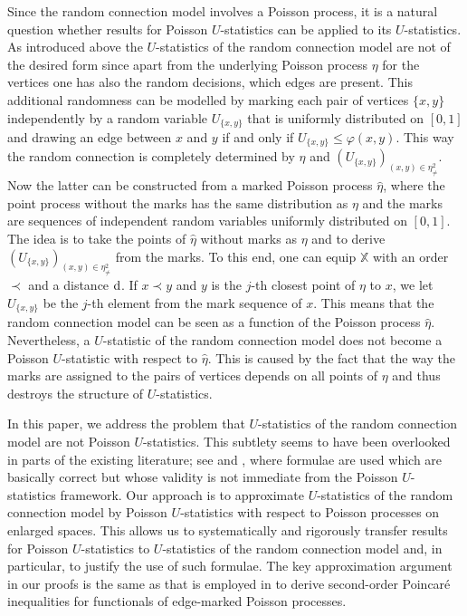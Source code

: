 \documentclass{article}
\theoremstyle{definition}
\numberwithin{equation}{section}
\theoremstyle{remark}
\begin{document}
Since the random connection model involves a Poisson process, it is a natural question whether results for Poisson $U$-statistics can be applied to its $U$-statistics. As introduced above the $U$-statistics of the random connection model are not of the desired form since apart from the underlying Poisson process $\eta$ for the vertices one has also the random decisions, which edges are present. This additional randomness can be modelled by marking each pair of vertices $\{x,y\}$ independently by a random variable $U_{\{x,y\}}$ that is uniformly distributed on $[0,1]$ and drawing an edge between $x$ and $y$ if and only if $U_{\{x,y\}}\leq\varphi(x,y)$. This way the random connection is completely determined by $\eta$ and $(U_{\{x,y\}})_{(x,y)\in\eta^2_{\neq}}$. Now the latter can be constructed from a marked Poisson process $\widehat{\eta}$, where the point process without the marks has the same distribution as $\eta$ and the marks are sequences of independent random variables uniformly distributed on $[0,1]$. The idea is to take the points of $\widehat{\eta}$ without marks as $\eta$ and to derive $(U_{\{x,y\}})_{(x,y)\in\eta^2_{\neq}}$ from the marks. To this end, one can equip $\mathbb{X}$ with an order $\prec$ and a distance ${\rm d}$. If $x\prec y$ and $y$ is the $j$-th closest point of $\eta$ to $x$, we let $U_{\{x,y\}}$ be the $j$-th element from the mark sequence of $x$. This means that the random connection model can be seen as a function of the Poisson process $\widehat{\eta}$. Nevertheless, a $U$-statistic of the random connection model does not become a Poisson $U$-statistic with respect to $\widehat{\eta}$. This is caused by the fact that the way the marks are assigned to the pairs of vertices depends on all points of $\eta$ and thus destroys the structure of $U$-statistics.   

In this paper, we address the problem that $U$-statistics of the random connection model are not Poisson $U$-statistics. This subtlety seems to have been overlooked in parts of the existing literature; see \cite{Heerten_Hirsch_Otto} and \cite{Otto25}, where formulae are used which are basically correct but whose validity is not immediate from the Poisson $U$-statistics framework. Our approach is to approximate $U$-statistics of the random connection model by Poisson $U$-statistics with respect to Poisson processes on enlarged spaces. This allows us to systematically and rigorously transfer results for Poisson $U$-statistics to $U$-statistics of the random connection model and, in particular, to justify the use of such formulae. The key approximation argument in our proofs is the same as that is employed in \cite{Last_Nestmann_Schulte} to derive second-order Poincar\'e inequalities for functionals of edge-marked Poisson processes.
\end{document}
